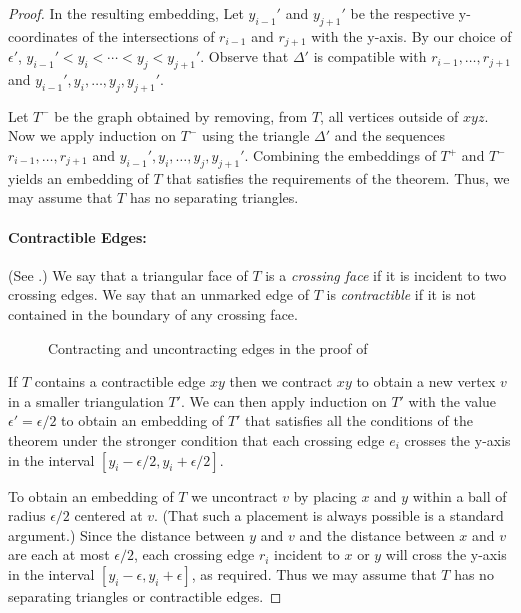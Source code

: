 \documentclass{patmorin}
\begin{document}
\begin{proof}
   In the resulting embedding, Let $y_{i-1}'$ and $y_{j+1}'$
   be the respective y-coordinates of the intersections of
   $r_{i-1}$ and $r_{j+1}$ with the y-axis.  By our choice of
   $\epsilon'$, $y_{i-1}'<y_i<\cdots<y_j<y_{j+1}'$.  Observe that
   $\Delta'$ is compatible with $r_{i-1},\ldots,r_{j+1}$ and
   $y_{i-1}',y_i,\ldots,y_j,y_{j+1}'$.

   Let $T^-$ be the graph obtained by removing, from $T$, all
   vertices outside of $xyz$.  Now we apply induction on $T^-$ using
   the triangle $\Delta'$ and the sequences $r_{i-1},\ldots,r_{j+1}$ and
   $y_{i-1}',y_i,\ldots,y_{j},y_{j+1}'$.  Combining the embeddings of $T^+$
   and $T^-$ yields an embedding of $T$ that satisfies the requirements of
   the theorem.  Thus, we may assume that $T$ has no separating triangles.

   \paragraph{Contractible Edges:}
   (See .)
   We say that a triangular face of $T$ is a \emph{crossing
   face} if it is incident to two crossing edges.  We say that an
   unmarked edge of $T$ is \emph{contractible} if it is not contained
   in the boundary of any crossing face.  
   \begin{figure}
      \caption{Contracting and uncontracting edges in the proof of
      }
   \end{figure}

   If $T$ contains a contractible edge $xy$ then we contract $xy$ to
   obtain a new vertex $v$ in a smaller triangulation $T'$.   We can then apply
   induction on $T'$ with the value $\epsilon'=\epsilon/2$ to obtain an
   embedding of $T'$ that satisfies all the conditions of the theorem under
   the stronger condition that each crossing edge $e_i$ crosses
   the y-axis in the interval $[y_i-\epsilon/2,y_i+\epsilon/2]$.

   To obtain an embedding of $T$ we uncontract $v$ by placing $x$ and $y$
   within a ball of radius $\epsilon/2$ centered at $v$. (That such
   a placement is always possible is a standard argument.)  Since the
   distance between $y$ and $v$ and the distance between $x$ and $v$ are each at most $\epsilon/2$,
   each crossing edge $r_i$ incident to $x$ or $y$ will cross
   the y-axis in the interval $[y_i-\epsilon,y_i+\epsilon]$, as required.
   Thus we may assume that $T$ has no separating triangles or contractible
   edges.


\end{proof}
\end{document}
